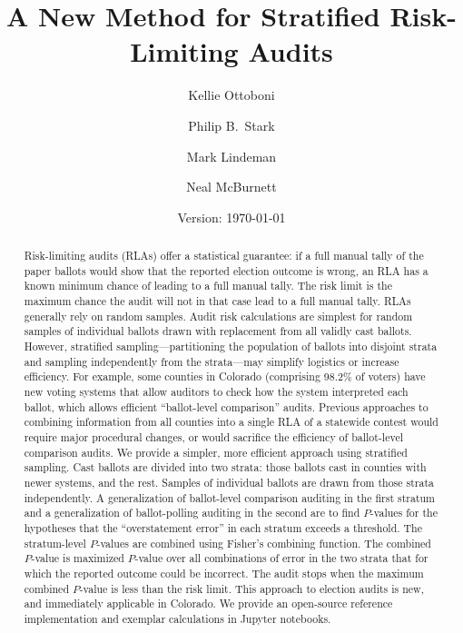\documentclass[runningheads]{llncs}
\title{A New Method for Stratified Risk-Limiting Audits}
\author{
   Kellie Ottoboni\inst{1}\orcidID{0000-0002-9107-3402} \and
   Philip B.~Stark\inst{1}\orcidID{0000-0002-3771-9604} \and
   Mark Lindeman\inst{2}\orcidID{0000-0001-8815-815X} \and
   Neal McBurnett\orcidID{0000-0001-8667-1830} 
}
\institute{
Department of Statistics, University of California, Berkeley, CA, USA \and
Verified Voting Foundation}
\date{Version: \today}
\begin{document}
\maketitle


\begin{abstract}
Risk-limiting audits (RLAs) offer a statistical guarantee: if a full manual tally of the paper ballots would show that the reported election outcome is wrong, an RLA has a known minimum chance of leading to a full manual tally.
The risk limit is the maximum chance the audit will not in that case lead to a full manual tally.
RLAs generally rely on random samples. 
Audit risk calculations are simplest for random samples of individual ballots drawn with replacement from all validly cast ballots.
However, stratified sampling---partitioning the population of ballots into disjoint
strata and sampling independently from the strata---may simplify logistics or increase efficiency.
For example, some counties in Colorado (comprising 98.2\% of voters)
have new voting systems that allow auditors to check how the system interpreted each ballot, which allows efficient ``ballot-level comparison'' audits.
Previous approaches to combining information from all counties into a single RLA of a statewide contest would require major procedural changes, or would sacrifice the efficiency of ballot-level comparison audits.
We provide a simpler, more efficient approach using stratified sampling.
Cast ballots are divided into two strata: those ballots cast in counties with newer systems, and the rest. 
Samples of individual ballots are drawn from those strata independently.
A generalization of ballot-level comparison auditing in the first stratum and a generalization of ballot-polling auditing in the second are to find $P$-values for the hypotheses that the ``overstatement error'' in each stratum exceeds a threshold.
The stratum-level $P$-values are combined using Fisher's combining function.
The combined $P$-value is maximized $P$-value over all combinations of error in the two strata that for which the reported outcome could be incorrect. 
The audit stops when the maximum combined $P$-value is less than the risk limit.
This approach to election audits is new, and immediately applicable in Colorado.
We provide an open-source reference implementation and exemplar calculations in Jupyter notebooks.

\end{abstract}
\end{document}
